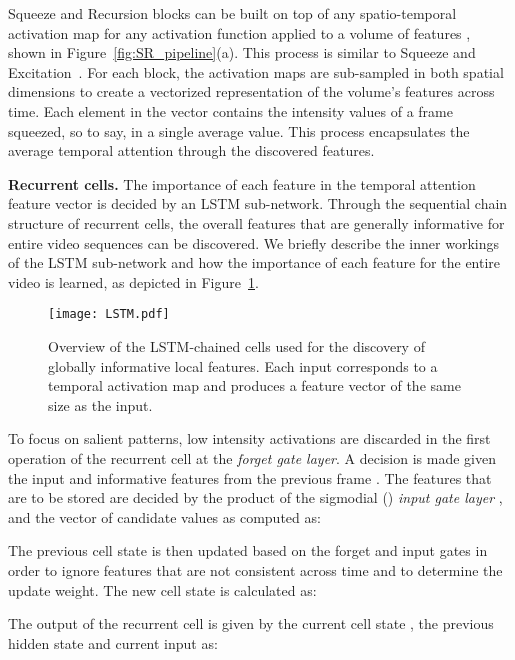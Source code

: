 \documentclass[final,5p,times,twocolumn]{elsarticle}
\begin{document}
Squeeze and Recursion blocks can be built on top of any spatio-temporal activation map  for any activation function  applied to a volume of features , shown in Figure~\ref{fig:SR_pipeline}(a). This process is similar to Squeeze and Excitation~\citep{hu2018squeeze}. For each block, the activation maps are sub-sampled in both spatial dimensions to create a vectorized representation of the volume's features across time. Each element in the vector contains the intensity values of a frame squeezed, so to say, in a single average value. This process encapsulates the average temporal attention through the discovered features.



\textbf{Recurrent cells.} The importance of each feature in the temporal attention feature vector is decided by an LSTM sub-network. Through the sequential chain structure of recurrent cells, the overall features that are generally informative for entire video sequences can be discovered. We briefly describe the inner workings of the LSTM sub-network \citep{hochreiter1997long} and how the importance of each feature for the entire video is learned, as depicted in Figure~\ref{fig:LSTM}.

\begin{figure}[!htb]
\centering
\texttt{[image: LSTM.pdf]}
\caption{Overview of the LSTM-chained cells used for the discovery of globally informative local features. Each input corresponds to a temporal activation map and produces a feature vector of the same size as the input.}
\label{fig:LSTM}
\end{figure}

To focus on salient patterns, low intensity activations are discarded in the first operation of the recurrent cell at the \textit{forget gate layer}. A decision  is made given the input  and informative features from the previous frame . The features that are to be stored are decided by the product of the sigmodial () \textit{input gate layer} , and the vector of candidate values  as computed as:
\vspace{-0.5mm}


The previous cell state  is then updated based on the forget and input gates in order to ignore features that are not consistent across time and to determine the update weight. The new cell state  is calculated as:
\vspace{-0.5mm}


The output of the recurrent cell  is given by the current cell state , the previous hidden state  and current input  as:
\vspace{-0.5mm}
\end{document}
